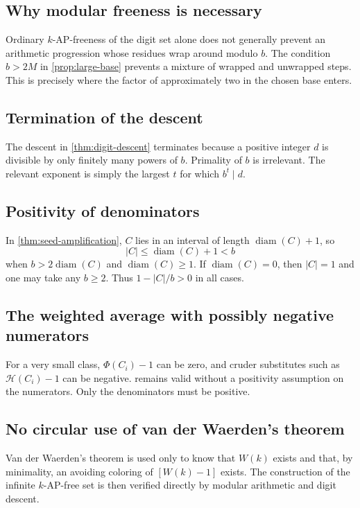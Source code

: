 \documentclass[11pt]{article}
\theoremstyle{definition}
\theoremstyle{remark}
\newcommand{\HH}{\mathcal{H}}
\newcommand{\diam}{\operatorname{diam}}
\begin{document}
\subsection{Why modular freeness is necessary}

Ordinary $k$-AP-freeness of the digit set alone does not generally prevent
an arithmetic progression whose residues wrap around modulo $b$.  The
condition $b>2M$ in \cref{prop:large-base} prevents a mixture of wrapped and
unwrapped steps.  This is precisely where the factor of approximately two
in the chosen base enters.

\subsection{Termination of the descent}

The descent in \cref{thm:digit-descent} terminates because a positive
integer $d$ is divisible by only finitely many powers of $b$.  Primality of
$b$ is irrelevant.  The relevant exponent is simply the largest $t$ for
which $b^t\mid d$.

\subsection{Positivity of denominators}

In \cref{thm:seed-amplification}, $C$ lies in an interval of length
$\diam(C)+1$, so
\[
 |C|\le\diam(C)+1<b
\]
when $b>2\diam(C)$ and $\diam(C)\ge1$.  If $\diam(C)=0$, then $|C|=1$ and
one may take any $b\ge2$.  Thus $1-|C|/b>0$ in all cases.

\subsection{The weighted average with possibly negative numerators}

For a very small class, $\Phi(C_i)-1$ can be zero, and cruder substitutes
such as $\HH(C_i)-1$ can be negative.   remains valid
without a positivity assumption on the numerators.  Only the denominators
must be positive.

\subsection{No circular use of van der Waerden's theorem}

Van der Waerden's theorem is used only to know that $W(k)$ exists and that,
by minimality, an avoiding coloring of $[W(k)-1]$ exists.  The construction
of the infinite $k$-AP-free set is then verified directly by modular
arithmetic and digit descent.
\end{document}
